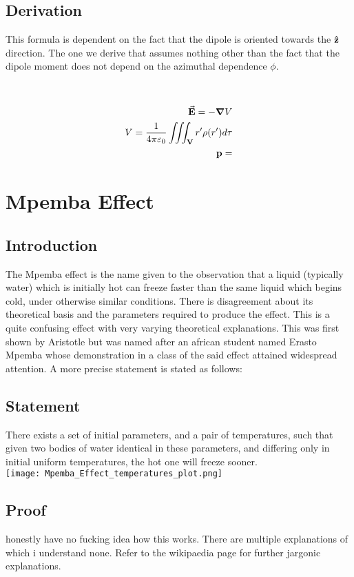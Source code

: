 \documentclass{article}
\begin{document}
\subsection{Derivation}
This formula is dependent on the fact that the dipole is oriented towards the $\vu{z}$ direction. The one we derive that assumes nothing other than the fact that the dipole moment does not depend on the azimuthal dependence $\phi$. \\ \\ \\
\begin{align*}
    \va{E} = -\grad V\\
    V = \frac{1}{4 \pi \varepsilon_0} \iiint_\mathbf{V}r'\rho(r')d\tau\\
    \vb{p} = 
\end{align*}

\section{Mpemba Effect}
\subsection{Introduction}
The Mpemba effect is the name given to the observation that a liquid (typically water) which is initially hot can freeze faster than the same liquid which begins cold, under otherwise similar conditions. There is disagreement about its theoretical basis and the parameters required to produce the effect. This is a quite confusing effect with very varying theoretical explanations. This was first shown by Aristotle but was named after an african student named Erasto Mpemba whose demonstration in a class of the said effect attained widespread attention. A more precise statement is stated as follows:
\subsection{Statement}
\begin{example*}
    There exists a set of initial parameters, and a pair of temperatures, such that given two bodies of water identical in these parameters, and differing only in initial uniform temperatures, the hot one will freeze sooner.\\
\texttt{[image: Mpemba\_Effect\_temperatures\_plot.png]}
\end{example*}
\subsection{Proof}
honestly have no fucking idea how this works. There are multiple explanations of which i understand none. Refer to the wikipaedia page for further jargonic explanations.
\newpage
\end{document}
